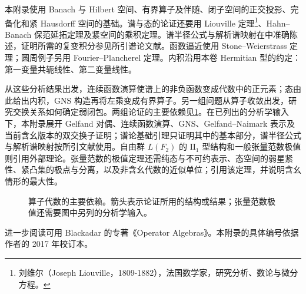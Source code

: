 \ProseParagraphBreak

本附录使用 Banach 与 Hilbert 空间、有界算子及伴随、闭子空间的正交投影、完备化和紧 Hausdorff 空间的基础。谱与态的论证还要用 Liouville 定理\footnote{刘维尔（Joseph Liouville，1809-1882），法国数学家，研究分析、数论与微分方程。}、Hahn--Banach 保范延拓定理及紧空间的乘积定理。谱半径公式与解析谱映射在中准确陈述，证明所需的复变积分参见所引谱论文献。函数逼近使用 Stone--Weierstrass 定理；圆周例子另用 Fourier--Plancherel 定理。内积沿用本卷 Hermitian 型的约定：第一变量共轭线性、第二变量线性。

\ProseParagraphBreak
从这些分析结果出发，连续函数演算使谱上的非负函数变成代数中的正元素；态由此给出内积，GNS 构造再将左乘变成有界算子。另一组问题从算子收敛出发，研究交换关系如何确定弱闭包。两组论证的主要依赖见\cref{b2:fig:operator-dependencies}。在已列出的分析学输入下，本附录展开 Gelfand 对偶、连续函数演算、GNS、Gelfand--Naimark 表示及当前含幺版本的双交换子证明；谱论基础引理只证明其中的基本部分，谱半径公式与解析谱映射按所引文献使用。自由群 \(L(F_2)\) 的 \(\mathrm{II}_1\) 型结构和一般张量范数极值则引用外部理论。张量范数的极值定理还需纯态与不可约表示、态空间的弱星紧性、紧凸集的极点与分离，以及非含幺代数的近似单位；引用该定理，并说明含幺情形的最大性。

\begin{figure}[htbp]
	\centering
	
	\caption[算子代数的主要依赖]{算子代数的主要依赖。箭头表示论证所用的结构或结果；张量范数极值还需要图中另列的分析学输入。}
	\label{b2:fig:operator-dependencies}
\end{figure}

进一步阅读可用 Blackadar 的专著《Operator Algebras》\cite{Blackadar2006OperatorAlgebras}。本附录的具体编号依据作者的 2017 年校订本\cite[\nopp I.9.1; II.2; II.6.4; II.9; III.1]{Blackadar2017OperatorAlgebrasCorrected}。







